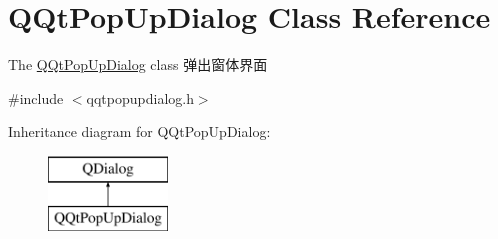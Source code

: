 \hypertarget{class_q_qt_pop_up_dialog}{}\section{Q\+Qt\+Pop\+Up\+Dialog Class Reference}
\label{class_q_qt_pop_up_dialog}


The \mbox{\hyperlink{class_q_qt_pop_up_dialog}{Q\+Qt\+Pop\+Up\+Dialog}} class 弹出窗体界面  




{\ttfamily \#include $<$qqtpopupdialog.\+h$>$}

Inheritance diagram for Q\+Qt\+Pop\+Up\+Dialog\+:\begin{figure}[H]
\begin{center}
\leavevmode
\includegraphics[height=2.000000cm]{class_q_qt_pop_up_dialog}
\end{center}
\end{figure}
